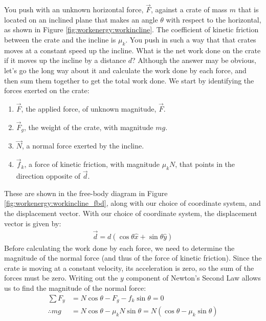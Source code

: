 \begin{example}{\label{ex:workenergy:networkramp}
You push with an unknown horizontal force, $\vec F$, against a crate of mass $m$ that is located on an inclined plane that makes an angle $\theta$ with respect to the horizontal, as shown in Figure \ref{fig:workenergy:workincline}. The coefficient of kinetic friction between the crate and the incline is $\mu_k$. You push in such a way that that crates moves at a constant speed up the incline. What is the net work done on the crate if it moves up the incline by a distance $d$?}
Although the answer may be obvious, let's go the long way about it and calculate the work done by each force, and then sum them together to get the total work done. We start by identifying the forces exerted on the crate:
\begin{enumerate}
\item $\vec F$, the applied force, of unknown magnitude, $\vec F$.
\item $\vec F_g$, the weight of the crate, with magnitude $mg$. 
\item $\vec N$, a normal force exerted by the incline.
\item $\vec f_k$, a force of kinetic friction, with magnitude $\mu_k N$, that points in the direction opposite of $\vec d$. 
\end{enumerate}
These are shown in the free-body diagram in Figure \ref{fig:workenergy:workincline_fbd}, along with our choice of coordinate system, and the displacement vector. 
With our choice of coordinate system, the displacement vector is given by:
\begin{align*}
\vec d = d (\cos\theta \hat x + \sin\theta \hat y)
\end{align*}
Before calculating the work done by each force, we need to determine the magnitude of the normal force (and thus of the force of kinetic friction). Since the crate is moving at a constant velocity, its acceleration is zero, so the sum of the forces must be zero. Writing out the $y$ component of Newton's Second Law allows us to find the magnitude of the normal force:
\begin{align*}
\sum F_y &= N\cos\theta -F_g - f_k\sin\theta = 0\\
\therefore mg &= N\cos\theta-\mu_kN\sin\theta = N(\cos\theta-\mu_k\sin\theta)\\

\end{align*}
\end{example}
